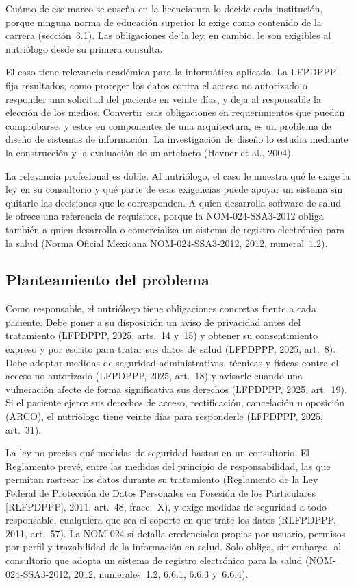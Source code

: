 \documentclass[12pt, a4paper]{article}
\begin{document}
Cuánto de ese marco se enseña en la licenciatura lo decide cada
institución, porque ninguna norma de educación superior lo exige como contenido de la
carrera (sección~3.1). Las
obligaciones de la ley, en cambio, le son exigibles al nutriólogo desde
su primera consulta.
 
El caso tiene relevancia académica para la informática aplicada. La
LFPDPPP fija resultados, como proteger los datos contra el acceso no
autorizado o responder una solicitud del paciente en veinte días, y
deja al responsable la elección de los medios. Convertir esas
obligaciones en requerimientos que puedan comprobarse, y estos en
componentes de una arquitectura, es un problema de diseño de sistemas
de información. La investigación de diseño lo estudia mediante la
construcción y la evaluación de un artefacto (Hevner et al., 2004).
 
La relevancia profesional es doble. Al nutriólogo, el caso le muestra
qué le exige la ley en su consultorio y qué parte de esas exigencias
puede apoyar un sistema sin quitarle las decisiones que le
corresponden. A quien desarrolla software de salud le ofrece una
referencia de requisitos, porque la NOM-024-SSA3-2012 obliga también a
quien desarrolla o comercializa un sistema de registro electrónico para
la salud (Norma Oficial Mexicana NOM-024-SSA3-2012, 2012,
numeral~1.2).

\subsection{Planteamiento del problema}
Como responsable, el nutriólogo tiene obligaciones concretas frente a
cada paciente. Debe poner a su disposición un aviso de privacidad antes
del tratamiento (LFPDPPP, 2025, arts.~14 y~15) y obtener su
consentimiento expreso y por escrito para tratar sus datos de salud
(LFPDPPP, 2025, art.~8). Debe adoptar medidas de seguridad
administrativas, técnicas y físicas contra el acceso no autorizado
(LFPDPPP, 2025, art.~18) y avisarle cuando una vulneración afecte de
forma significativa sus derechos (LFPDPPP, 2025, art.~19). Si el
paciente ejerce sus derechos de acceso, rectificación, cancelación u
oposición (ARCO), el nutriólogo tiene veinte días para responderle
(LFPDPPP, 2025, art.~31).
 
La ley no precisa
qué medidas de seguridad bastan en un consultorio. El Reglamento prevé,
entre las medidas del principio de responsabilidad, las que permitan
rastrear los datos durante su tratamiento (Reglamento de la Ley Federal
de Protección de Datos Personales en Posesión de los Particulares
[RLFPDPPP], 2011, art.~48, fracc.~X), y exige medidas de seguridad a todo
responsable, cualquiera que sea el soporte en que trate los datos
(RLFPDPPP, 2011, art.~57). La NOM-024 sí detalla
credenciales propias por usuario, permisos por perfil y trazabilidad de
la información en salud. Solo obliga, sin embargo, al consultorio que
adopta un sistema de registro electrónico para la salud
(NOM-024-SSA3-2012, 2012, numerales~1.2, 6.6.1, 6.6.3 y~6.6.4).
 
\end{document}
